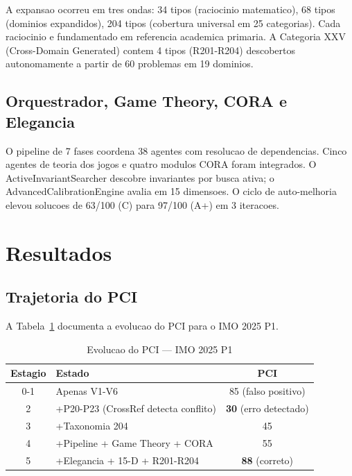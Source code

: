 \documentclass[5p]{elsarticle}
\begin{document}
A expansao ocorreu em tres ondas: 34 tipos (raciocinio matematico), 68 tipos
(dominios expandidos), 204 tipos (cobertura universal em 25 categorias). Cada
raciocinio e fundamentado em referencia academica primaria. A Categoria XXV
(Cross-Domain Generated) contem 4 tipos (R201-R204) descobertos autonomamente
a partir de 60 problemas em 19 dominios.

\subsection{Orquestrador, Game Theory, CORA e Elegancia}

O pipeline de 7 fases coordena 38 agentes com resolucao de dependencias. Cinco
agentes de teoria dos jogos \cite{nash1950,vonneumann1944,shapley1953} e quatro
modulos CORA \cite{macedo2025} foram integrados. O ActiveInvariantSearcher
descobre invariantes por busca ativa; o AdvancedCalibrationEngine avalia em 15
dimensoes. O ciclo de auto-melhoria elevou solucoes de 63/100 (C) para 97/100
(A+) em 3 iteracoes.

\section{Resultados}

\subsection{Trajetoria do PCI}

A Tabela~\ref{tab:pci} documenta a evolucao do PCI para o IMO 2025 P1.

\begin{table}[H]
\centering
\caption{Evolucao do PCI --- IMO 2025 P1}
\label{tab:pci}
\small
\begin{tabular}{clc}
\toprule
\textbf{Estagio} & \textbf{Estado} & \textbf{PCI}\\
\midrule
0-1 & Apenas V1-V6 & 85 (falso positivo)\\
\rowcolor{redbg} 2 & +P20-P23 (CrossRef detecta conflito) & \textbf{30} (erro detectado)\\
3 & +Taxonomia 204 & 45\\
4 & +Pipeline + Game Theory + CORA & 55\\
\rowcolor{greenbg} 5 & +Elegancia + 15-D + R201-R204 & \textbf{88} (correto)\\
\bottomrule
\end{tabular}
\end{table}
\end{document}

